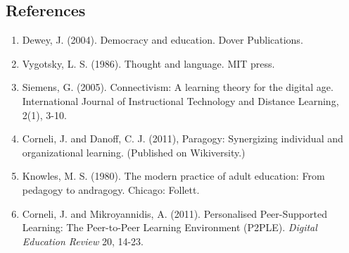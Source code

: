 \subsection{References}

\begin{enumerate}
\itemsep1pt\parskip0pt
\item
  Dewey, J. (2004). Democracy and education. Dover Publications.
\item
  Vygotsky, L. S. (1986). Thought and language. MIT press.
\item
  Siemens, G. (2005). Connectivism: A learning theory for the digital
  age. International Journal of Instructional Technology and Distance
  Learning, 2(1), 3-10.
\item
  Corneli, J. and Danoff, C. J. (2011), Paragogy: Synergizing individual
  and organizational learning. (Published on Wikiversity.)
\item
  Knowles, M. S. (1980). The modern practice of adult education: From
  pedagogy to andragogy. Chicago: Follett.
\item
  Corneli, J. and Mikroyannidis, A. (2011). Personalised Peer-Supported
  Learning: The Peer-to-Peer Learning Environment (P2PLE). \emph{Digital
  Education Review} 20, 14-23.
\end{enumerate}
